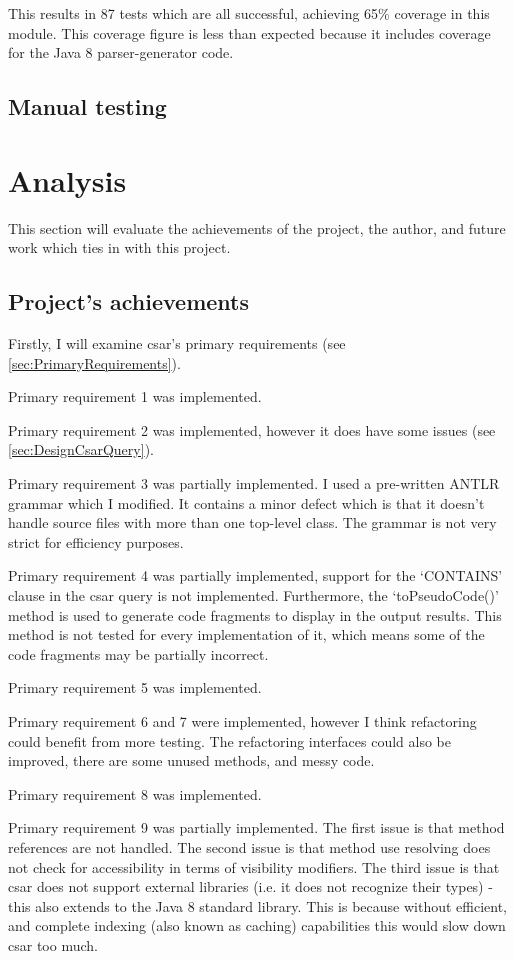 \documentclass[12pt, letterpaper]{article}
\begin{document}
This results in 87 tests which are all successful, achieving 65\% coverage in this module.
This coverage figure is less than expected because it includes coverage for the Java 8 parser-generator code.

\subsection{Manual testing}

\section{Analysis}
This section will evaluate the achievements of the project, the author, and future work which ties in with this project.

\subsection{Project's achievements}
Firstly, I will examine csar's primary requirements (see \ref{sec:PrimaryRequirements}).

Primary requirement 1 was implemented. 

Primary requirement 2 was implemented, however it does have some issues (see \ref{sec:DesignCsarQuery}).

Primary requirement 3 was partially implemented.
I used a pre-written ANTLR grammar which I modified. 
It contains a minor defect which is that it doesn't handle source files with more than one top-level class.
The grammar is not very strict for efficiency purposes.

Primary requirement 4 was partially implemented, support for the `CONTAINS' clause in the csar query is not implemented.
Furthermore, the `toPseudoCode()' method is used to generate code fragments to display in the output results.
This method is not tested for every implementation of it, which means some of the code fragments may be partially incorrect.

Primary requirement 5 was implemented.

Primary requirement 6 and 7 were implemented, however I think refactoring could benefit from more testing.
The refactoring interfaces could also be improved, there are some unused methods, and messy code.

Primary requirement 8 was implemented.

Primary requirement 9 was partially implemented. The first issue is that method references are not handled.
The second issue is that method use resolving does not check for accessibility in terms of visibility modifiers.
The third issue is that csar does not support external libraries (i.e. it does not recognize their types) - this also extends to the Java 8 standard library.
This is because without efficient, and complete indexing (also known as caching) capabilities this would slow down csar too much.
\end{document}

